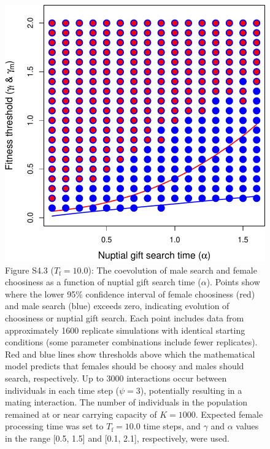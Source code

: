 \documentclass[
]{article}
\begin{document}
\captionsetup{labelformat=default}

\clearpage

\captionsetup{labelformat=empty}

\begin{figure}
\centering
\includegraphics{ms_refs_fixed_files/figure-latex/unnamed-chunk-8-1.pdf}
\caption{Figure S4.3 (\(T_{\mathrm{f}} = 10.0\)): The coevolution of
male search and female choosiness as a function of nuptial gift search
time (\(\alpha\)). Points show where the lower 95\% confidence interval
of female choosiness (red) and male search (blue) exceeds zero,
indicating evolution of choosiness or nuptial gift search. Each point
includes data from approximately 1600 replicate simulations with
identical starting conditions (some parameter combinations include fewer
replicates). Red and blue lines show thresholds above which the
mathematical model predicts that females should be choosy and males
should search, respectively. Up to 3000 interactions occur between
individuals in each time step (\(\psi = 3\)), potentially resulting in a
mating interaction. The number of individuals in the population remained
at or near carrying capacity of \(K = 1000\). Expected female processing
time was set to \(T_{\mathrm{f}}=10.0\) time steps, and \(\gamma\) and
\(\alpha\) values in the range {[}0.5, 1.5{]} and {[}0.1, 2.1{]},
respectively, were used.}
\end{figure}
\end{document}

